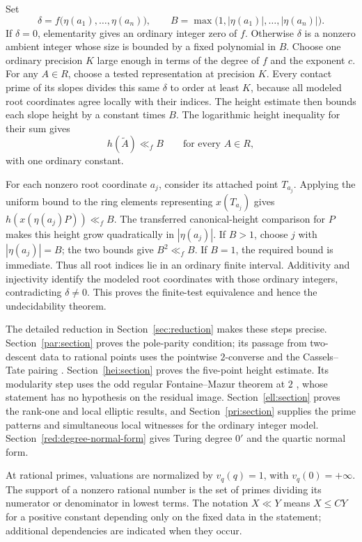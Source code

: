 Set
\[
 \delta=f\bigl(\eta(a_1),\ldots,\eta(a_n)\bigr),
 \qquad
 B=\max\bigl(1,|\eta(a_1)|,\ldots,|\eta(a_n)|\bigr).
\]
If \(\delta=0\), elementarity gives an ordinary integer zero of \(f\). Otherwise \(\delta\) is a nonzero ambient integer whose size is bounded by a fixed polynomial in \(B\). Choose one ordinary precision \(K\) large enough in terms of the degree of \(f\) and the exponent \(c\). For any \(A\in R\), choose a tested representation at precision \(K\). Every contact prime of its slopes divides this same \(\delta\) to order at least \(K\), because all modeled root coordinates agree locally with their indices. The height estimate then bounds each slope height by a constant times \(B\). The logarithmic height inequality for their sum gives
\[
                         h(\widetilde A)\ll_f B
                         \qquad\text{for every }A\in R,
\]
with one ordinary constant.

For each nonzero root coordinate \(a_j\), consider its attached point
\(T_{a_j}\). Applying the uniform bound to the ring elements representing
\(x(T_{a_j})\) gives \(h(x(\eta(a_j)P))\ll_f B\).
The transferred canonical-height comparison for \(P\) makes this height grow
quadratically in \(|\eta(a_j)|\). If \(B>1\), choose \(j\) with
\(|\eta(a_j)|=B\); the two bounds give \(B^2\ll_f B\). If \(B=1\), the
required bound is immediate. Thus all root indices lie in an ordinary finite
interval. Additivity and injectivity identify the modeled root coordinates
with those ordinary integers, contradicting \(\delta\ne0\). This proves the
finite-test equivalence and hence the undecidability theorem.

The detailed reduction in Section~\ref{sec:reduction} makes these steps
precise. Section~\ref{par:section} proves the pole-parity condition; its
passage from two-descent data to rational points uses the pointwise
$2$-converse \cite[Theorem~1.1]{PointwiseTwoConverse} and the
Cassels--Tate pairing \cite{Cassels1962}.
Section~\ref{hei:section} proves the five-point height estimate. Its
modularity step uses the odd regular Fontaine--Mazur theorem at $2$
\cite[Theorem~1.1]{OddRegularFontaineMazurAtTwo}, whose statement has no
hypothesis on the residual image. Section~\ref{ell:section} proves the
rank-one and local elliptic results, and Section~\ref{pri:section}
supplies the prime patterns and simultaneous local witnesses for the
ordinary integer model. Section~\ref{red:degree-normal-form} gives
Turing degree $0'$ and the quartic normal form.

At rational primes, valuations are normalized by \(v_q(q)=1\), with
\(v_q(0)=+\infty\). The support of a nonzero rational number is the set of
primes dividing its numerator or denominator in lowest terms. The notation
\(X\ll Y\) means \(X\le CY\) for a positive constant depending only on the
fixed data in the statement; additional dependencies are indicated when
they occur.
